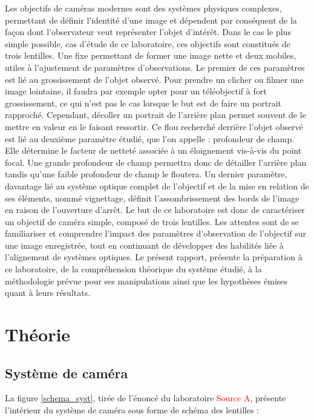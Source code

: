 \documentclass[11pt,letterpaper]{article}
\begin{document}
Les objectifs de caméras modernes sont des systèmes physiques complexes, permettant de définir l'identité d'une image et dépendent par conséquent de la façon dont l'observateur veut représenter l'objet d'intérêt. Dans le cas le plus simple possible, cas d'étude de ce laboratoire, ces objectifs sont constitués de trois lentilles. Une fixe permettant de former une image nette et deux mobiles, utiles à l'ajustement de paramètres d'observations. Le premier de ces paramètres est lié au grossissement de l'objet observé. Pour prendre un clicher ou filmer une image lointaine, il faudra par exemple opter pour un téléobjectif à fort grossissement, ce qui n'est pas le cas lorsque le but est de faire un portrait rapproché. Cependant, décoller un portrait de l'arrière plan permet souvent de le mettre en valeur en le faisant ressortir. Ce flou recherché derrière l'objet observé est lié au deuxième paramètre étudié, que l'on appelle : profondeur de champ. Elle détermine le facteur de netteté associée à un éloignement vis-à-vis du point focal. Une grande profondeur de champ permettra donc de détailler l'arrière plan tandis qu'une faible profondeur de champ le floutera. Un dernier paramètre, davantage lié au système optique complet de l'objectif et de la mise en relation de ses éléments, nommé vignettage, définit l'assombrissement des bords de l'image en raison de l'ouverture d'arrêt. Le but de ce laboratoire est donc de caractériser un objectif de caméra simple, composé de trois lentilles. Les attentes sont de se familiariser et comprendre l'impact des paramètres d'observation de l'objectif sur une image enregistrée, tout en continuant de développer des habilités liée à l'alignement de systèmes optiques. Le présent rapport, présente la préparation à ce laboratoire, de la compréhension théorique du système étudié, à la méthodologie prévue pour ses manipulations ainsi que les hypothèses émises quant à leurs résultats. 

\section{Théorie}

\subsection{Système de caméra}

La figure \ref{schema_syst}, tirée de l'énoncé du laboratoire \textcolor{red}{Source A}, présente
l'intérieur du système de caméra sous forme de schéma des lentilles :
\end{document}
